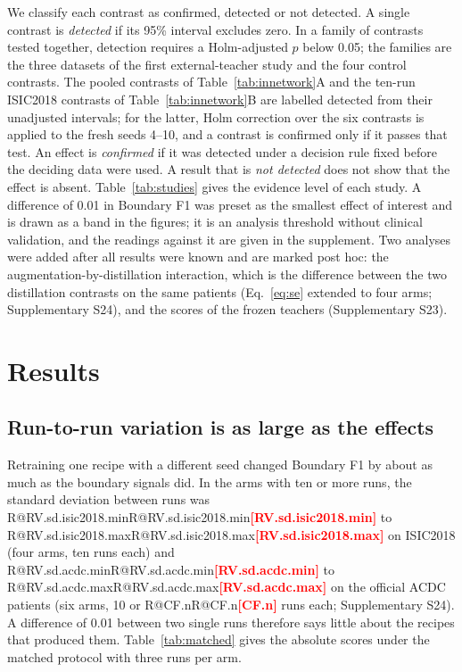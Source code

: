 \documentclass[fleqn,10pt,lineno]{wlpeerj}
\makeatletter
\newcommand{\R}[1]{\ifcsname R@#1\endcsname\csname R@#1\endcsname\else\textbf{\textcolor{red}{[#1]}}\fi}
\makeatother
\begin{document}
We classify each contrast as confirmed, detected or not detected. A single contrast is \emph{detected} if its 95\% interval excludes zero. In a family of contrasts tested together, detection requires a Holm-adjusted $p$ \citep{Holm1979A} below 0.05; the families are the three datasets of the first external-teacher study and the four control contrasts. The pooled contrasts of Table~\ref{tab:innetwork}A and the ten-run ISIC2018 contrasts of Table~\ref{tab:innetwork}B are labelled detected from their unadjusted intervals; for the latter, Holm correction over the six contrasts is applied to the fresh seeds 4--10, and a contrast is confirmed only if it passes that test. An effect is \emph{confirmed} if it was detected under a decision rule fixed before the deciding data were used. A result that is \emph{not detected} does not show that the effect is absent. Table~\ref{tab:studies} gives the evidence level of each study. A difference of 0.01 in Boundary F1 was preset as the smallest effect of interest and is drawn as a band in the figures; it is an analysis threshold without clinical validation, and the readings against it are given in the supplement. Two analyses were added after all results were known and are marked post hoc: the augmentation-by-distillation interaction, which is the difference between the two distillation contrasts on the same patients (Eq.~\ref{eq:se} extended to four arms; Supplementary S24), and the scores of the frozen teachers (Supplementary S23).

\section*{Results}

\subsection*{Run-to-run variation is as large as the effects}
Retraining one recipe with a different seed changed Boundary F1 by about as much as the boundary signals did. In the arms with ten or more runs, the standard deviation between runs was \R{RV.sd.isic2018.min} to \R{RV.sd.isic2018.max} on ISIC2018 (four arms, ten runs each) and \R{RV.sd.acdc.min} to \R{RV.sd.acdc.max} on the official ACDC patients (six arms, 10 or \R{CF.n} runs each; Supplementary S24). A difference of 0.01 between two single runs therefore says little about the recipes that produced them. Table~\ref{tab:matched} gives the absolute scores under the matched protocol with three runs per arm.
\end{document}
